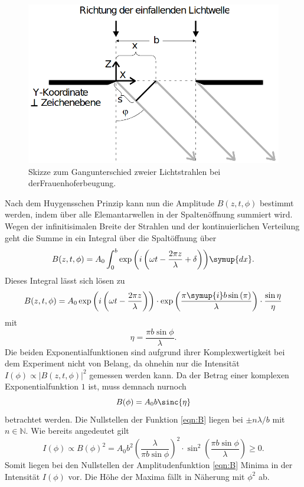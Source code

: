 \begin{figure}[H]
    \centering
    \includegraphics[scale = 0.45]{pictures/frauenhofer2.png}
    \caption{Skizze zum Gangunterschied zweier Lichtstrahlen bei derFrauenhoferbeugung. \cite{AP01}}
    \label{fig:frauenhofer2}
\end{figure}

\noindent
Nach dem Huygensschen Prinzip kann nun die Amplitude $B(z,t,\phi)$ bestimmt werden, indem über alle Elemantarwellen 
in der Spaltenöffnung summiert wird. Wegen der infinitisimalen Breite der Strahlen und der kontinuierlichen Verteilung geht die Summe in ein 
Integral über die Spaltöffnung über
\begin{equation*}
    B(z,t,\phi)=A_0\int_0^b{\exp{\left(i\left(\omega t-\frac{2\pi z}{\lambda}+\delta\right)\right)}\symup{dx}}    .
\end{equation*}
Dieses Integral lässt sich lösen zu 
\begin{equation*}
    B(z,t,\phi) = A_0\exp{\left(i\left(\omega t-\frac{2 \pi z}{\lambda}\right)\right)}
                \cdot\exp{\left(\frac{\pi \symup{i} b \sin{(\pi)}}{\lambda}\right)}
                \cdot\frac{\sin{\eta}}{\eta}
\end{equation*}
mit
\begin{equation*}
    \eta=\frac{\pi b \sin{\phi}}{\lambda}   .
\end{equation*}
Die beiden Exponentialfunktionen sind aufgrund ihrer Komplexwertigkeit bei dem Experiment nicht von Belang, da ohnehin nur
die Intensität $I(\phi)\propto |B(z,t,\phi)|^2$ gemessen werden kann. Da der Betrag einer komplexen Exponentialfunktion $\num{1}$ ist, muss 
demnach nurnoch 
\begin{equation}
    B(\phi)=A_0b\sinc{\eta}
    \label{eqn:B}
\end{equation}
betrachtet werden. Die Nullstellen der Funktion \eqref{eqn:B} liegen bei $\pm n\lambda/b$ mit $n \in \mathbb{N}$.
Wie bereits angedeutet gilt 
\begin{equation}
    I(\phi)\propto B(\phi)^2=
    A_0b^2\left(\frac{\lambda}{\pi b \sin{\phi}}\right)^2 \cdot \sin^2{\left(\frac{\pi b \sin{\phi}}{\lambda}\right)}
    \geq 0  .
    \label{eqn:intensität1}
\end{equation}
Somit liegen bei den Nullstellen der Amplitudenfunktion \ref{eqn:B} Minima in der Intensität $I(\phi)$ vor. Die Höhe der Maxima fällt in 
Näherung mit $\phi^2$ ab.   

